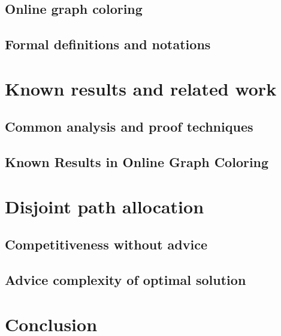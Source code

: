 \documentclass[12pt,a4paper]{report}
\begin{document}
\section{Online graph coloring}
\label{section:online-graph}

\section{Formal definitions and notations}
\label{section:definitions}


\chapter{Known results and related work}
\label{chapter:known}

\section{Common analysis and proof techniques}
\label{section:techniques}

\section{Known Results in Online Graph Coloring}
\label{section:known-graph}


\chapter{Disjoint path allocation}
\label{chapter:dpa}

\section{Competitiveness without advice}
\label{section:dpa-no-advice}

\section{Advice complexity of optimal solution}
\label{section:dpa-optimal}


\chapter*{Conclusion}
\label{chapter:conclusion}



\printbibliography

\appendix

%
\end{document}
